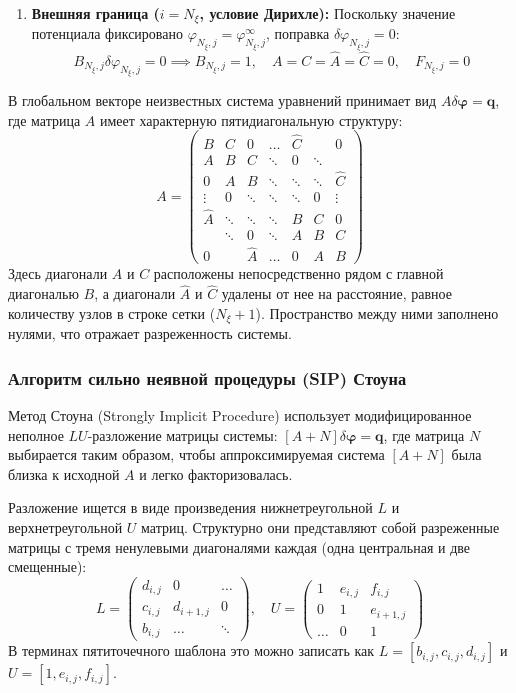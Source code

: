 \begin{enumerate}
		\item \textbf{Внешняя граница ($i=N_\xi$, условие Дирихле):} 
		Поскольку значение потенциала фиксировано $\varphi_{N_\xi,j} = \varphi_{N_\xi,j}^\infty$, поправка $\delta \varphi_{N_\xi,j} = 0$:
		\[ B_{N_\xi,j} \delta\varphi_{N_\xi,j} = 0 \implies B_{N_\xi,j} = 1, \quad A = C = \hat{A} = \hat{C} = 0, \quad F_{N_\xi,j} = 0 \]

	\end{enumerate}	
		В глобальном векторе неизвестных система уравнений принимает вид $A \delta \boldsymbol{\varphi} = \mathbf{q}$, где матрица $A$ имеет характерную пятидиагональную структуру:
	\[
	A = \begin{pmatrix}
		B & C & 0 & \dots & \hat{C} & & 0 \\
		A & B & C & \ddots & 0 & \ddots & \\
		0 & A & B & \ddots & \ddots & \ddots & \hat{C} \\
		\vdots & 0 & \ddots & \ddots & \ddots & 0 & \vdots \\
		\hat{A} & \ddots & \ddots & \ddots & B & C & 0 \\
		& \ddots & 0 & \ddots & A & B & C \\
		0 & & \hat{A} & \dots & 0 & A & B 
	\end{pmatrix}
	\]
	Здесь диагонали $A$ и $C$ расположены непосредственно рядом с главной диагональю $B$, а диагонали $\hat{A}$ и $\hat{C}$ удалены от нее на расстояние, равное количеству узлов в строке сетки ($N_\xi+1$). Пространство между ними заполнено нулями, что отражает разреженность системы.
	
	
	\subsubsection{Алгоритм сильно неявной процедуры (SIP) Стоуна}
	
	Метод Стоуна \cite{stone1968} (Strongly Implicit Procedure) использует модифицированное неполное $LU$-разложение матрицы системы: $[A+N] \delta \boldsymbol{\varphi} = \mathbf{q}$, где матрица $N$ выбирается таким образом, чтобы аппроксимируемая система $[A+N] $ была близка к исходной $A$ и легко факторизовалась.
	
	Разложение ищется в виде произведения нижнетреугольной $L$ и верхнетреугольной $U$ матриц. Структурно они представляют собой разреженные матрицы с тремя ненулевыми диагоналями каждая (одна центральная и две смещенные):
	\[
	L = \begin{pmatrix}
		d_{i,j} & 0 & \dots \\
		c_{i,j} & d_{i+1,j} & 0 \\
		b_{i,j} & \dots & \ddots
	\end{pmatrix}, \quad
	U = \begin{pmatrix}
		1 & e_{i,j} & f_{i,j} \\
		0 & 1 & e_{i+1,j} \\
		\dots & 0 & 1
	\end{pmatrix}
	\]
	В терминах пятиточечного шаблона это можно записать как $L = [b_{i,j}, c_{i,j}, d_{i,j}]$ и $U = [1, e_{i,j}, f_{i,j}]$.
	
